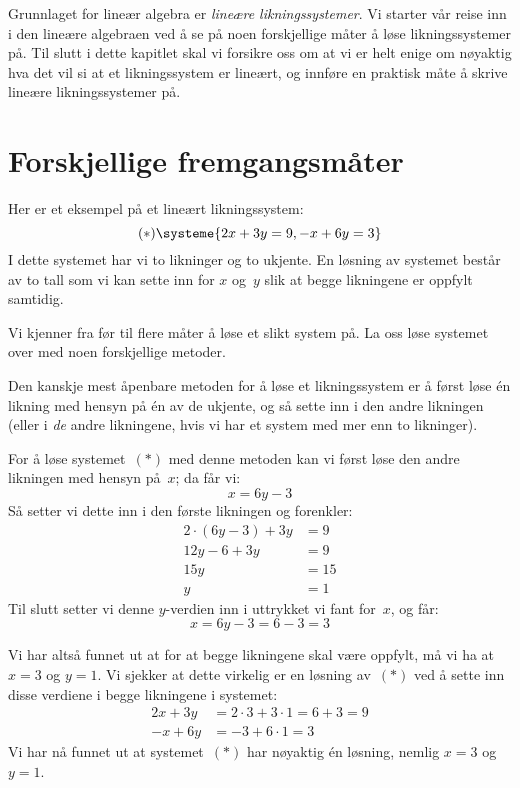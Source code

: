 

\label{ch:lineare-likningssystemer}

Grunnlaget for lineær algebra er \emph{lineære liknings\-systemer}.
Vi starter vår reise inn i den lineære algebraen ved å se på noen
forskjellige måter å løse likningssystemer på.  Til slutt i dette
kapitlet skal vi forsikre oss om at vi er helt enige om nøyaktig hva
det vil si at et likningssystem er lineært, og innføre en praktisk
måte å skrive lineære likningssystemer på.

\section*{Forskjellige fremgangsmåter}

Her er et eksempel på et lineært likningssystem:
\[
(\ast)
\systeme{
2x + 3y = 9,
-x + 6y = 3
}
\]
I dette systemet har vi to likninger og to ukjente.
En løsning av systemet består av to tall som vi kan sette inn
for $x$ og~$y$ slik at begge likningene er oppfylt samtidig.

Vi kjenner fra før til flere måter å løse et slikt system på.  La oss
løse systemet over med noen forskjellige metoder.

\begin{ex}
Den kanskje mest åpenbare metoden for å løse et likningssystem er å
først løse én likning med hensyn på én av de ukjente, og så sette inn
i den andre likningen (eller i \emph{de} andre likningene, hvis vi har
et system med mer enn to likninger).

For å løse systemet~$(\ast)$ med denne metoden kan vi først løse den
andre likningen med hensyn på~$x$; da får vi:
\[
x = 6y - 3
\]
Så setter vi dette inn i den første likningen og forenkler:
\begin{align*}
2 \cdot (6y - 3) + 3y &= 9 \\
12y - 6 + 3y &= 9 \\
15y &= 15 \\
y &= 1
\end{align*}
Til slutt setter vi denne $y$-verdien inn i uttrykket vi fant for~$x$,
og får:
\[
x = 6y - 3 = 6 - 3 = 3
\]

Vi har altså funnet ut at for at begge likningene skal være oppfylt,
må vi ha at $x = 3$ og $y = 1$.  Vi sjekker at dette virkelig er en
løsning av~$(\ast)$ ved å sette inn disse verdiene i begge likningene
i systemet:
\begin{align*}
2x + 3y &= 2 \cdot 3 + 3 \cdot 1 = 6 + 3 = 9 \\
-x + 6y &= -3 + 6 \cdot 1 = 3
\end{align*}
Vi har nå funnet ut at systemet~$(\ast)$ har nøyaktig én løsning,
nemlig $x = 3$ og $y = 1$.
\end{ex}

